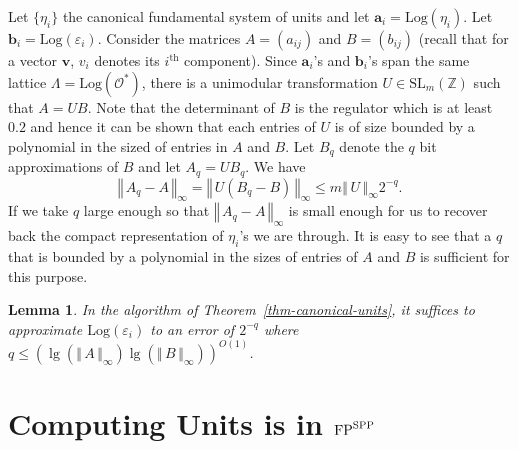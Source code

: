 \documentclass{article}
\newcommand{\Log}[1]{\mathrm{Log}\left(#1\right)}
\newcommand{\FP}{{\rm FP}}
\newcommand{\SPP}{{\rm SPP}}
\newtheorem{lemma}[theorem]{Lemma}
\theoremstyle{definition}\newtheorem{remark}[theorem]{Remark}
\newcommand {\norm} [1] {\ensuremath {\left\Vert\,#1\,\right\Vert}}
\renewcommand{\vector}[1]{\ensuremath{\mathbf{#1}}}
\begin{document}
Let $\{ \eta_i \}$ the canonical fundamental system of units and let
$\vector{a}_i = \Log{\eta_i}$. Let $\vector{b}_i =
\Log{\varepsilon_i}$.  Consider the matrices $A = (a_{ij})$ and $B =
(b_{ij})$ (recall that for a vector $\vector{v}$, $v_i$ denotes its
$i^{\mathrm{th}}$ component). Since $\vector{a}_i$'s and
$\vector{b}_i$'s span the same lattice $\Lambda =
\Log{\mathcal{O}^*}$, there is a unimodular transformation $U \in
\mathrm{SL}_m(\mathbb{Z})$ such that $A = UB$. Note that the
determinant of $B$ is the regulator which is at least $0.2$ and hence
it can be shown that each entries of $U$ is of size bounded by a
polynomial in the sized of entries in $A$ and $B$. Let $B_q$ denote
the $q$ bit approximations of $B$ and let $A_q = U B_q$. We have
\[
\norm{A_q - A}_\infty = \norm{U(B_q - B)}_\infty \leq m
\norm{U}_\infty 2^{-q}.
\]
If we take $q$ large enough so that $\norm{A_q - A}_\infty$ is
small enough for us to recover back the compact representation of
$\eta_i$'s we are through. It is easy to see that a $q$ that is
bounded by a polynomial in the sizes of entries of $A$ and $B$ is
sufficient for this purpose.

\begin{lemma}
  In the algorithm of Theorem~\ref{thm-canonical-units}, it
  suffices to approximate $\Log{\varepsilon_i}$ to an error of
  $2^{-q}$ where $q \leq (\lg(\norm{A}_\infty)
  \lg(\norm{B}_\infty))^{O(1)}$.
\end{lemma}


\section{ Computing Units is in $\FP^{\SPP}$}\label{five}
\end{document}

